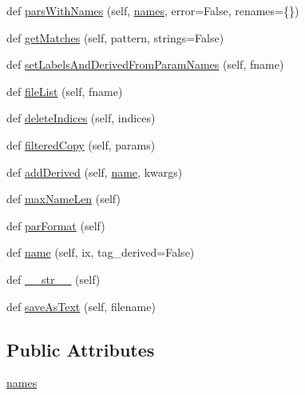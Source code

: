 \begin{DoxyCompactItemize}
\item 
def \mbox{\hyperlink{classgetdist_1_1paramnames_1_1ParamList_ad267d72764306a71f58d6c051f2584b5}{pars\+With\+Names}} (self, \mbox{\hyperlink{classgetdist_1_1paramnames_1_1ParamList_a9213bdfb6fb036e21d6adb49a91c2b66}{names}}, error=False, renames=\{\})
\item 
def \mbox{\hyperlink{classgetdist_1_1paramnames_1_1ParamList_acd3847e84096601009f5ccb145392457}{get\+Matches}} (self, pattern, strings=False)
\item 
def \mbox{\hyperlink{classgetdist_1_1paramnames_1_1ParamList_a1c0f1ff83138b0ff5a99c21d43314888}{set\+Labels\+And\+Derived\+From\+Param\+Names}} (self, fname)
\item 
def \mbox{\hyperlink{classgetdist_1_1paramnames_1_1ParamList_a96e124851867f3679768756bb4dbd4c3}{file\+List}} (self, fname)
\item 
def \mbox{\hyperlink{classgetdist_1_1paramnames_1_1ParamList_ace8728a95682cb04e0c137b9b7d6fd7e}{delete\+Indices}} (self, indices)
\item 
def \mbox{\hyperlink{classgetdist_1_1paramnames_1_1ParamList_a8722a4df4ec0e3ec0de8a47752562a0a}{filtered\+Copy}} (self, params)
\item 
def \mbox{\hyperlink{classgetdist_1_1paramnames_1_1ParamList_ae0b3e03a0f2f485e7cc2dca1c8b7864e}{add\+Derived}} (self, \mbox{\hyperlink{classgetdist_1_1paramnames_1_1ParamList_aea1705e69ca01b937e118b44e468510a}{name}}, kwargs)
\item 
def \mbox{\hyperlink{classgetdist_1_1paramnames_1_1ParamList_ad65897f1aba22e11c87438a840db6683}{max\+Name\+Len}} (self)
\item 
def \mbox{\hyperlink{classgetdist_1_1paramnames_1_1ParamList_a99b5b8568cc722be33974838ee0aefc5}{par\+Format}} (self)
\item 
def \mbox{\hyperlink{classgetdist_1_1paramnames_1_1ParamList_aea1705e69ca01b937e118b44e468510a}{name}} (self, ix, tag\+\_\+derived=False)
\item 
def \mbox{\hyperlink{classgetdist_1_1paramnames_1_1ParamList_a8366c518269bbc00de2f25fc8596628d}{\+\_\+\+\_\+str\+\_\+\+\_\+}} (self)
\item 
def \mbox{\hyperlink{classgetdist_1_1paramnames_1_1ParamList_accba4a0697557d04e3727ea2f4ccb5c7}{save\+As\+Text}} (self, filename)
\end{DoxyCompactItemize}
\subsection*{Public Attributes}
\begin{DoxyCompactItemize}
\item 
\mbox{\hyperlink{classgetdist_1_1paramnames_1_1ParamList_a9213bdfb6fb036e21d6adb49a91c2b66}{names}}
\end{DoxyCompactItemize}


